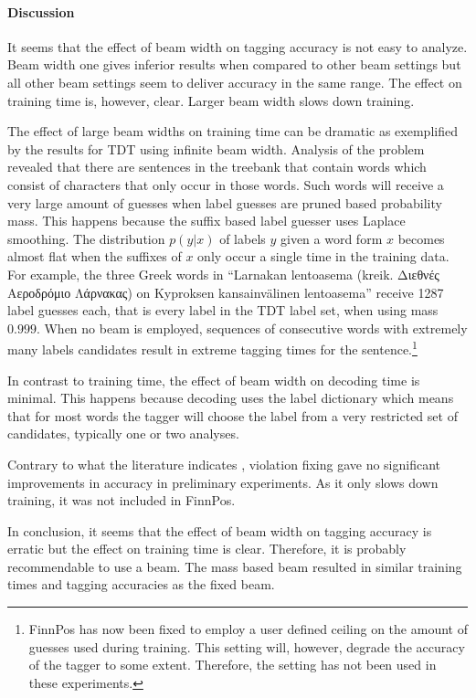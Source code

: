 \paragraph{Discussion} It seems that the effect of beam width on
tagging accuracy is not easy to analyze. Beam width one gives inferior
results when compared to other beam settings but all other beam
settings seem to deliver accuracy in the same range. The effect on
training time is, however, clear. Larger beam width slows down
training. 

The effect of large beam widths on training time can be dramatic as
exemplified by the results for TDT using infinite beam width. Analysis
of the problem revealed that there are sentences in the treebank that
contain words which consist of characters that only occur in those
words. Such words will receive a very large amount of guesses when
label guesses are pruned based probability mass. This happens because
the suffix based label guesser uses Laplace smoothing. The
distribution $p(y|x)$ of labels $y$ given a word form $x$ becomes
almost flat when the suffixes of $x$ only occur a single time in the
training data. For example, the three Greek words in ``Larnakan
lentoasema (kreik. Διεθνές Aεροδρόμιο Λάρνακας) on Kyproksen
kansainvälinen lentoasema'' receive 1287 label guesses each, that is
every label in the TDT label set, when using mass $0.999$. When no
beam is employed, sequences of consecutive words with extremely many
labels candidates result in extreme tagging times for the
sentence.\footnote{FinnPos has now been fixed to employ a user defined
  ceiling on the amount of guesses used during training. This setting
  will, however, degrade the accuracy of the tagger to some
  extent. Therefore, the setting has not been used in these
  experiments.}

In contrast to training time, the effect of beam width on decoding
time is minimal. This happens because decoding uses the label
dictionary which means that for most words the tagger will choose the
label from a very restricted set of candidates, typically one or two
analyses.

Contrary to what the literature indicates
\citep{Huang2012,Collins2004}, violation fixing gave no significant
improvements in accuracy in preliminary experiments. As it only slows
down training, it was not included in FinnPos.

In conclusion, it seems that the effect of beam width on tagging
accuracy is erratic but the effect on training time is
clear. Therefore, it is probably recommendable to use a beam. The mass
based beam resulted in similar training times and tagging accuracies
as the fixed beam. 

